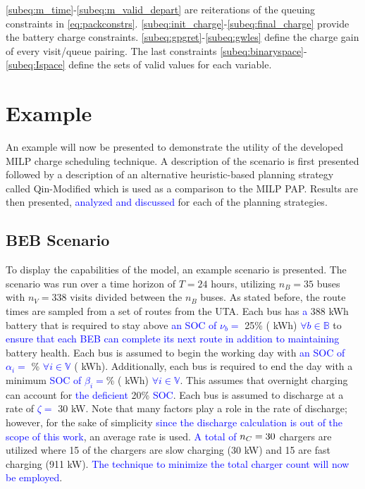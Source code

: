\documentclass[utf8]{FrontiersinHarvard}
\newcommand{\A}{35 }                                                            %
\newcommand{\N}{338 }                                                           %
\newcommand{\acharge}{0.9}                                                      %
\newcommand{\bcharge}{0.7 }                                                     %
\newcommand{\mincharge}{25\% }                                                  %
\newcommand{\minchargeD}{0.25 }                                                 %
\newcommand{\batsize}{388 }                                                     %
\newcommand{\fast}{15 }                                                         %
\newcommand{\slow}{15 }                                                         %
\newcommand{\fasts}{911 }                                                       %
\newcommand{\slows}{30 }                                                        %
\begin{document}
\autoref{subeq:m_time}-\autoref{subeq:m_valid_depart} are reiterations of the queuing constraints in
\autoref{eq:packconstrs}. \autoref{subeq:init_charge}-\autoref{subeq:final_charge} provide the battery charge
constraints. \autoref{subeq:gpgret}-\autoref{subeq:gwles} define the charge gain of every visit/queue pairing. The last
constraints \autoref{subeq:binaryspace}-\autoref{subeq:Ispace} define the sets of valid values for each variable.
\section{Example}
\label{sec:example}
An example will now be presented to demonstrate the utility of the developed MILP charge scheduling technique. A
description of the scenario is first presented followed by a description of an alternative heuristic-based planning
strategy called Qin-Modified which is used as a comparison to the MILP PAP. Results are then presented,
\textcolor{blue}{analyzed and discussed} for each of the planning strategies.

\subsection{BEB Scenario}
\label{beb-scenario}
To display the capabilities of the model, an example scenario is presented. The scenario was run over a time horizon of
\(T=24\) hours, utilizing \(n_B = \A\) buses with \(n_V = \N\) visits divided between the \(n_B\) buses. As stated before, the
route times are sampled from a set of routes from the UTA. Each bus has \textcolor{blue}{a} \batsize kWh battery that is
required to stay above \textcolor{blue}{an SOC of $\nu_b =$} \mincharge (\fpeval{\batsize * \minchargeD} kWh)
\textcolor{blue}{$\forall b \in \mathbb{B}$} to \textcolor{blue}{ensure that each BEB can complete its next route in addition to maintaining} battery health. Each bus is assumed to begin the working day with \textcolor{blue}{an SOC of $\alpha_i = $}
\fpeval{\acharge*100}\% \textcolor{blue}{$\forall i \in \mathbb{V}$} (\fpeval{\acharge * \batsize} kWh). Additionally, each bus is
required to end the day with a minimum \textcolor{blue}{ SOC of $\beta_i = $}\fpeval{\bcharge * 100}\%
(\fpeval{\bcharge * \batsize} kWh) \textcolor{blue}{$\forall i \in \mathbb{V}$}. This assumes that overnight charging
can account for \textcolor{blue}{the deficient} 20\% \textcolor{blue}{SOC}. Each bus is assumed to discharge at a rate of
\textcolor{blue}{$\zeta = $} 30 kW. Note that many factors play a role in the rate of discharge; however, for the sake of
simplicity \textcolor{blue}{since the discharge calculation is out of the scope of this work}, an average rate is used.
\textcolor{blue}{A total of} \(n_C = \fpeval{\fast + \slow}\) chargers are utilized where \slow of the chargers are slow
charging (\slows kW) and \fast are fast charging (\fasts kW). \textcolor{blue}{The technique to minimize the total charger count will now be employed}.
\end{document}
